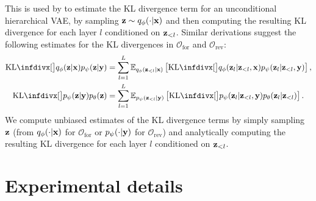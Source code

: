This is used by \citet{vahdat2020nvae,child2020very} to estimate the KL
divergence term for an unconditional hierarchical VAE, by sampling ${\mathbf{z}}\sim
q_\phi(\cdot|{\mathbf{x}})$ and then computing the resulting KL divergence for each layer $l$
conditioned on ${\mathbf{z}}_{<l}$. Similar derivations suggest the following estimates for
the KL divergences in $\mathcal{O}_\mathrm{for}$ and $\mathcal{O}_\text{rev}$:
\begin{align}
  \kl[\big]{q_\phi(\rvz|\rvx)}{p_\psi(\rvz|\rvy)} &= \sum_{l=1}^L \EX_{q_\phi(\rvz_{<l}|\rvx)} \left[ \kl[\big]{q_\phi(\rvz_l|\rvz_{<l}, \rvx)}{p_\psi(\rvz_l|\rvz_{<l}, \rvy)} \right], \\
  \kl[\big]{p_\psi(\rvz|\rvy)}{p_\theta(\rvz)} &= \sum_{l=1}^L \EX_{p_\psi(\rvz_{<l}|\rvy)} \left[ \kl[\big]{p_\psi(\rvz_l|\rvz_{<l}, \rvy)}{p_\theta(\rvz_l|\rvz_{<l})} \right].
\end{align}
We compute unbiased estimates of the KL divergence terms by simply sampling ${\mathbf{z}}$
(from $q_\phi(\cdot|{\mathbf{x}})$ for $\mathcal{O}_\mathrm{for}$ or
$p_\psi(\cdot|{\mathbf{y}})$ for $\mathcal{O}_\text{rev}$) and analytically
computing the resulting KL divergence for each layer $l$ conditioned on
${\mathbf{z}}_{<l}$.


\section{Experimental details} \label{supp:cigcvae-exp-details}

